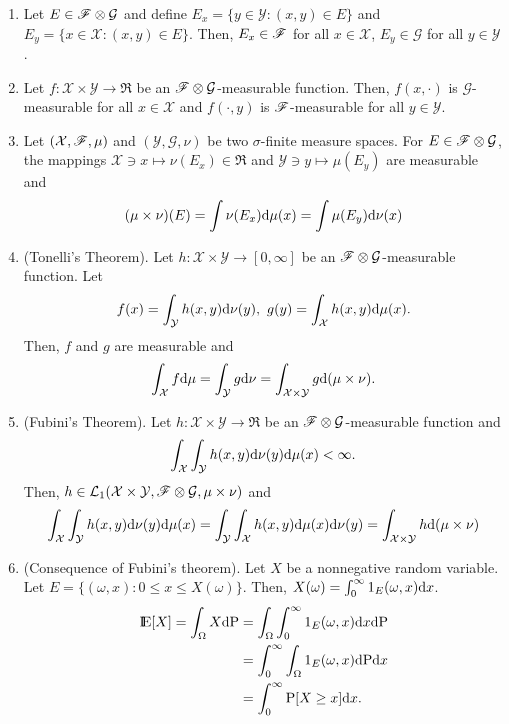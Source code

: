 \documentclass[a4paper,10pt]{scrbook}
\begin{document}
\begin{enumerate}
 \item Let $E\in \mathscr{F}\otimes\mathcal{G}$ and define 
       $E_x = \{y\in \mathcal{Y}: (x,y)\in E\}$ and $E_y = \{x\in \mathcal{X}: (x,y)\in E\}$.
       Then, $E_x\in \mathscr{F}$ for all $x\in\mathcal{X}$, $E_y\in\mathcal{G}$ for all $y\in\mathcal{Y}$.
 \item Let $f:\mathcal{X}\times\mathcal{Y}\to \Re$ be an $\mathscr{F}\otimes \mathcal{G}$-measurable function.
       Then, $f(x,\cdot)$ is $\mathcal{G}$-measurable for all $x\in\mathcal{X}$ and 
       $f(\cdot, y)$ is $\mathscr{F}$-measurable for all $y\in\mathcal{Y}$.
 \item Let $(\mathcal{X},\mathscr{F},\mu)$ and $(\mathcal{Y},\mathcal{G},\nu)$ be two $\sigma$-finite measure spaces.
       For $E\in\mathscr{F}\otimes\mathcal{G}$, the mappings $\mathcal{X}\ni x\mapsto \nu(E_x) \in \Re$ and 
       $\mathcal{Y}\ni y\mapsto \mu(E_y)$ are measurable and
       \[
        (\mu\times \nu)(E) = \int \nu(E_x)\mathrm{d} \mu(x) = \int \mu(E_y)\mathrm{d} \nu(x)
       \]
 \item (Tonelli's Theorem). Let $h:\mathcal{X}\times \mathcal{Y}\to[0,\infty]$ be an $\mathscr{F}\otimes\mathcal{G}$-measurable
       function. Let
       \[
        f(x) = \int_{\mathcal{Y}} h(x,y) \mathrm{d}\nu(y), \ g(y) = \int_{\mathcal{X}}h(x,y)\mathrm{d}\mu(x).
       \]
       Then, $f$ and $g$ are measurable and 
       \[
        \int_{\mathcal{X}}f\mathrm{d}\mu = \int_{\mathcal{Y}}g\mathrm{d}\nu = \int_{\mathcal{X}\times\mathcal{Y}}g\mathrm{d}(\mu\times \nu).
       \]
 \item (\hypertarget{link:fubini}{Fubini's Theorem}). 
       Let $h:\mathcal{X}\times \mathcal{Y}\to \Re$ be an $\mathscr{F}\otimes\mathcal{G}$-measurable
       function and
       \[
        \int_{\mathcal{X}} \int_{\mathcal{Y}} h(x,y)\mathrm{d}\nu(y) \mathrm{d}\mu(x) < \infty.
       \]
       Then, $h\in\mathcal{L}_1(\mathcal{X}\times\mathcal{Y}, \mathscr{F}\otimes\mathcal{G}, \mu\times\nu)$ and
        \[
        \int_{\mathcal{X}} \int_{\mathcal{Y}} h(x,y)\mathrm{d}\nu(y) \mathrm{d}\mu(x) = 
        \int_{\mathcal{Y}} \int_{\mathcal{X}} h(x,y)\mathrm{d}\mu(x) \mathrm{d}\nu(y) = 
        \int_{\mathcal{X}\times\mathcal{Y}} h \mathrm{d}(\mu\times \nu)
       \]
       
 \item (Consequence of Fubini's theorem). Let $X$ be a nonnegative random variable. Let $E=\{(\omega, x): 0 \leq x\leq X(\omega)\}$.
       Then, $X(\omega) = \int_{0}^{\infty}1_{E}(\omega, x)\mathrm{d} x$.
       \begin{align*}
        \E[X] = \int_{\Omega}X\d\prob &= \int_{\Omega}\int_{0}^{\infty}1_{E}(\omega, x)\d x\d \prob\\
                                      &= \int_{0}^{\infty} \int_{\Omega} 1_{E}(\omega, x)\d \prob \d x\\
                                      &= \int_{0}^{\infty} \prob[X\geq x]\d x.
       \end{align*}

\end{enumerate}
\end{document}
